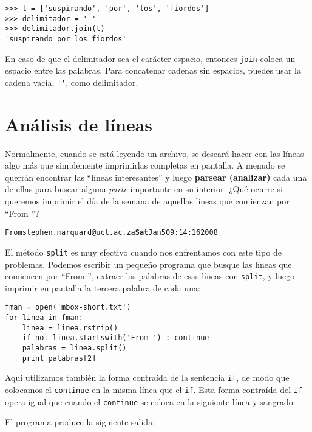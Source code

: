 
\beforeverb
\begin{verbatim}
>>> t = ['suspirando', 'por', 'los', 'fiordos']
>>> delimitador = ' '
>>> delimitador.join(t)
'suspirando por los fiordos'
\end{verbatim}
\afterverb
%
En caso de que el delimitador sea el carácter espacio,
entonces {\tt join} coloca un espacio entre las palabras. Para concatenar
cadenas sin espacios, puedes usar la cadena vacía,
\verb"''", como delimitador.



\section{Análisis de líneas}

Normalmente, cuando se está leyendo un archivo,
se deseará hacer con las líneas algo más que simplemente
imprimirlas completas en pantalla. A menudo se querrán encontrar
las ``líneas interesantes'' y luego {\bf parsear (analizar)} cada una de ellas
para buscar alguna \emph{parte} importante en su interior. ¿Qué ocurre si queremos
imprimir el día de la semana de aquellas líneas que comienzan por ``From ''?

\beforeverb
\begin{alltt}
From stephen.marquard@uct.ac.za {\bf Sat} Jan  5 09:14:16 2008
\end{alltt}
\afterverb

El método {\tt split} es muy efectivo cuando nos enfrentamos con este
tipo de problemas.
Podemos escribir un pequeño programa que busque las líneas que
comiencen por ``From '', extraer las palabras de esas líneas con {\tt split},
y luego imprimir en pantalla la tercera palabra de cada una:

\beforeverb
\begin{verbatim}
fman = open('mbox-short.txt')
for linea in fman:
    linea = linea.rstrip()
    if not linea.startswith('From ') : continue
    palabras = linea.split()
    print palabras[2]
\end{verbatim}
\afterverb
%
Aquí utilizamos también la forma contraída de la sentencia
{\tt if}, de modo que colocamos el {\tt continue} en la
misma línea que el {\tt if}. Esta forma contraída
del {\tt if} opera igual que cuando el
{\tt continue} se coloca en la siguiente línea y sangrado.

El programa produce la siguiente salida:

